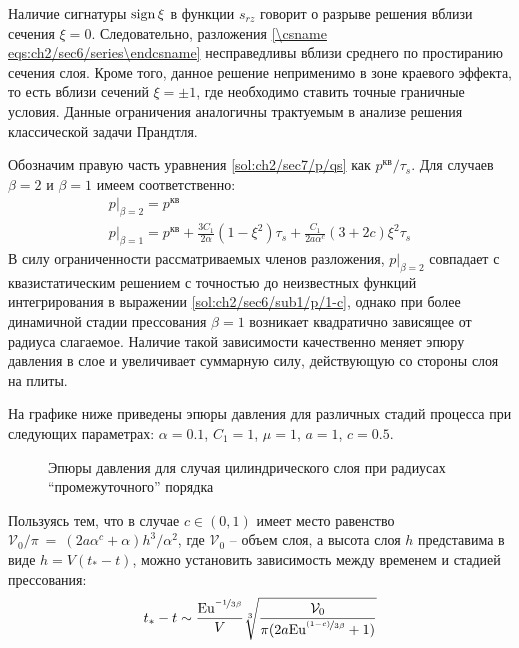 Наличие сигнатуры $\operatorname{sign}\xi$ в функции $s_{rz}$ говорит о разрыве решения вблизи сечения $\xi=0$. Следовательно, разложения \cref{\csname eqs:ch2/sec6/series\endcsname} несправедливы вблизи среднего по простиранию сечения слоя. Кроме того, данное решение неприменимо в зоне краевого эффекта, то есть вблизи сечений $\xi=\pm 1$, где необходимо ставить точные граничные условия. Данные ограничения аналогичны трактуемым в анализе решения классической задачи Прандтля.

Обозначим правую часть уравнения \cref{sol:ch2/sec7/p/qs} как $p^\text{кв} / \tau_{s}$. Для случаев $\beta=2$ и $\beta=1$ имеем соответственно:
\begin{gather}
  p\lvert_{\beta=2} = p^\text{кв}
  \\
  p\lvert_{\beta=1} = p^\text{кв} + \frac{3C_1}{2\alpha} \left(1-\xi^2\right) \tau_{s} + \frac{C_1}{2a \alpha^{c}}\left(3+2c\right)\xi^2 \tau_{s}
\end{gather}
В силу ограниченности рассматриваемых членов разложения, $p\lvert_{\beta=2}$ совпадает с квазистатическим решением с точностью до неизвестных функций интегрирования в выражении \cref{sol:ch2/sec6/sub1/p/1-c}, однако при более динамичной стадии прессования $\beta=1$ возникает квадратично зависящее от радиуса слагаемое. Наличие такой зависимости качественно меняет эпюру давления в слое и увеличивает суммарную силу, действующую со стороны слоя на плиты.

На графике ниже приведены эпюры давления для различных стадий процесса при следующих параметрах: $\alpha=0.1$, $C_1=1$, $\mu=1$, $a=1$, $c=0.5$.
\begin{figure}[ht]
  \caption{Эпюры давления для случая цилиндрического слоя при радиусах ``промежуточного'' порядка}
  \label{fig:ch2/sec7/pressure}
\end{figure}

Пользуясь тем, что в случае $c\in\left(0,1\right)$ имеет место равенство $\mathcal{V}_0 / \pi~=~\left(2a \alpha^{c} + \alpha\right) h^{3} / \alpha^{2}$, где $\mathcal{V}_0$ -- объем слоя, а высота слоя $h$ представима в виде $h=V \left(t_*-t\right)$, можно установить зависимость между временем и стадией прессования:
\begin{equation}
  t_* - t \sim \frac{\text{Eu}^{\nicefrac{-1}{3\beta}}}{V}\sqrt[3]{\frac{\mathcal{V}_0}{\pi(2a\text{Eu}^{\nicefrac{(1-c)}{3\beta}}+1)}}
\end{equation}
